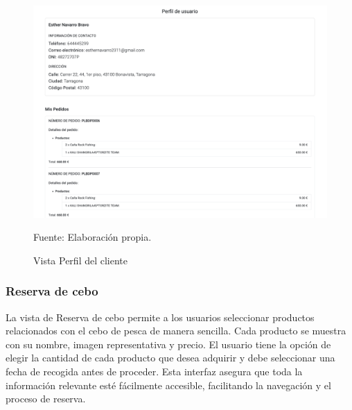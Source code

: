 \begin{figure}[H]
\begin{center}
\includegraphics[scale=0.5]{./Images/vistaPerfilUsuario.png}
\caption{Vista Perfil del cliente} Fuente: Elaboración propia.

\label{fig:fig1}

\end{center}
\end{figure}


\subsubsection{Reserva de cebo}\label{subsec5.1.1.3}

La vista de Reserva de cebo permite a los usuarios seleccionar productos relacionados con el cebo de pesca de manera sencilla. Cada producto se muestra con su nombre, imagen representativa y precio. El usuario tiene la opción de elegir la cantidad de cada producto que desea adquirir y debe seleccionar una fecha de recogida antes de proceder. Esta interfaz asegura que toda la información relevante esté fácilmente accesible, facilitando la navegación y el proceso de reserva.

